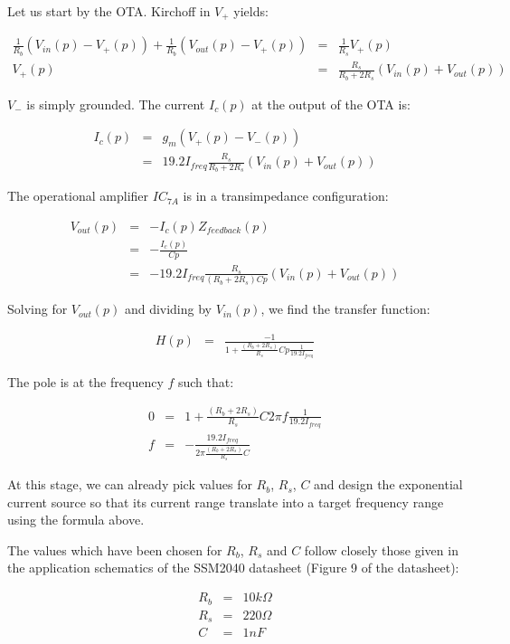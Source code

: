 \documentclass[a4paper,11pt]{article}
\begin{document}
Let us start by the OTA. Kirchoff in $V_+$ yields:

\begin{eqnarray}
\frac{1}{R_b}(V_{in}(p) - V_+(p)) + \frac{1}{R_b} (V_{out}(p) - V_+(p)) &=& \frac{1}{R_s} V_+(p) \\
V_+(p) &=& \frac{R_s}{R_b + 2 R_s} (V_{in}(p) + V_{out}(p))
\end{eqnarray}

$V_-$ is simply grounded. The current $I_c(p)$ at the output of the OTA is:

\begin{eqnarray}
I_c(p) &=& g_m (V_+(p) - V_-(p)) \\
 &=& 19.2 I_{freq} \frac{R_s}{R_b + 2 R_s} (V_{in}(p) + V_{out}(p))
\end{eqnarray}

The operational amplifier $IC_{7A}$ is in a transimpedance configuration:

\begin{eqnarray}
V_{out}(p) &=& - I_c(p) Z_{feedback}(p) \\
 &=& - \frac{I_c(p)}{Cp} \\
 &=& - 19.2 I_{freq} \frac{R_s}{(R_b + 2 R_s)Cp} (V_{in}(p) + V_{out}(p))
\end{eqnarray}

Solving for $V_{out}(p)$ and dividing by $V_{in}(p)$, we find the transfer function:

\begin{eqnarray}
H(p) &=& \frac{-1}{1 + \frac{(R_b + 2 R_s)}{R_s} Cp \frac{1}{19.2 I_{freq}}}
\end{eqnarray}

The pole is at the frequency $f$ such that:

\begin{eqnarray}
0 &=& 1 + \frac{(R_b + 2 R_s)}{R_s} C 2\pi f \frac{1}{19.2 I_{freq}} \\
f &=& -\frac{19.2 I_{freq}}{2 \pi \frac{(R_b + 2 R_s)}{R_s} C}
\end{eqnarray}

At this stage, we can already pick values for $R_b$, $R_s$, $C$ and design the exponential current source so that its current range translate into a target frequency range using the formula above.

The values which have been chosen for $R_b$, $R_s$ and $C$ follow closely those given in the application schematics of the SSM2040 datasheet (Figure 9 of the datasheet):

\begin{eqnarray*}
R_b &=& 10 k \Omega \\
R_s &=& 220 \Omega \\
C &=& 1 nF
\end{eqnarray*}
\end{document}
